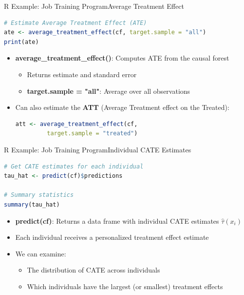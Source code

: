 \documentclass[hyperref={pdfpagelabels=false}]{beamer}
\begin{document}
\begin{frame}[fragile]{R Example: Job Training Program}{Average Treatment Effect}
\begin{lstlisting}[language=R]
# Estimate Average Treatment Effect (ATE)
ate <- average_treatment_effect(cf, target.sample = "all")
print(ate)
\end{lstlisting}
	\begin{itemize}
		\item \textbf{average\_treatment\_effect()}: Computes ATE from the causal forest
		\vspace{0.2cm}
		\begin{itemize}
			\item Returns estimate and standard error
			\vspace{0.2cm}
			\item \textbf{target.sample = "all"}: Average over all observations
		\end{itemize}
		\vspace{0.3cm}
		\item Can also estimate the \textbf{ATT} (Average Treatment effect on the Treated):
\begin{lstlisting}[language=R]
att <- average_treatment_effect(cf,
         target.sample = "treated")
\end{lstlisting}
	\end{itemize}
\end{frame}




\begin{frame}[fragile]{R Example: Job Training Program}{Individual CATE Estimates}
\begin{lstlisting}[language=R]
# Get CATE estimates for each individual
tau_hat <- predict(cf)$predictions

# Summary statistics
summary(tau_hat)
\end{lstlisting}
	\begin{itemize}
		\item \textbf{predict(cf)}: Returns a data frame with individual CATE estimates $\hat{\tau}(x_i)$
		\vspace{0.2cm}
		\item Each individual receives a personalized treatment effect estimate
		\vspace{0.3cm}
		\item We can examine:
		\vspace{0.2cm}
		\begin{itemize}
			\item The distribution of CATE across individuals
			\vspace{0.2cm}
			\item Which individuals have the largest (or smallest) treatment effects
		\end{itemize}
	\end{itemize}
\end{frame}
\end{document}
